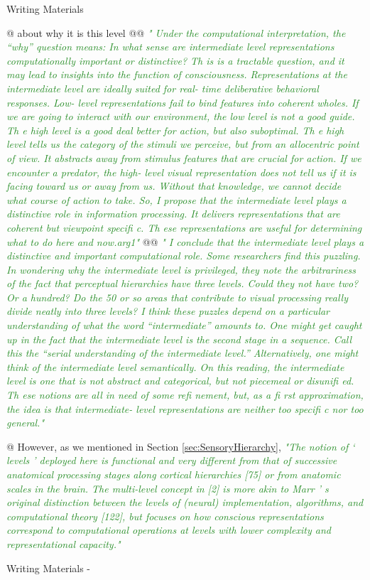 \documentclass[utf8]{article}
\newenvironment{WritingMaterials} %
    	{
            \begin{tcolorbox}[enhanced,
                title=-,
                size=small,
                colbacktitle=Aquamarine,
                drop fuzzy shadow,
                fontupper=\small,
                boxrule=0.4pt,
                colback=Aquamarine!10!white,
                sharp corners]
                Writing Materials
            \end{tcolorbox}
            \begin{easylist}[itemize]
    	}
    	{
            \end{easylist}  
            \begin{tcolorbox}[enhanced,
                halign=flush right,
                halign title=right,
                size=small,
                colbacktitle=Aquamarine,
                drop fuzzy shadow,
                fontupper=\small,
                boxrule=0.4pt,
                colback=Aquamarine,
                colupper=White,
                sharp corners]
                Writing Materials -
            \end{tcolorbox}        
    	}
\newcommand{\rewrite}[1]{\textcolor{ForestGreen}{\textit{"#1"}}\newline}
\begin{document}
\begin{WritingMaterials}
				@ about why it is this level
				@@ \rewrite{
					Under the computational interpretation, the “why” question means: In what sense are intermediate level representations computationally important or distinctive? Th is is a tractable question, and it may lead to insights into the function of consciousness. Representations at the intermediate level are ideally suited for real- time deliberative behavioral responses. Low- level representations fail to bind features into coherent wholes. If we are going to interact with our environment, the low level is not a good guide. Th e high level is a good deal better for action, but also suboptimal. Th e high level tells us the category of the stimuli we perceive, but from an allocentric point of view. It abstracts away from stimulus features that are crucial for action. If we encounter a predator, the high- level visual representation does not tell us if it is facing toward us or away from us. Without that knowledge, we cannot decide what course of action to take. So, I propose that the intermediate level plays a distinctive role in information processing. It delivers representations that are coherent but viewpoint specifi c. Th ese representations are useful for determining what to do here and now.arg1} \cite{prinz2007intermediate}
				@@ \rewrite{
					I conclude that the intermediate level plays a distinctive and important computational role. Some researchers find this puzzling. In wondering why the intermediate level is privileged, they note the arbitrariness of the fact that perceptual hierarchies have three levels. Could they not have two? Or a hundred? Do the 50 or so areas that contribute to visual processing really divide neatly into three levels? I think these puzzles depend on a particular understanding of what the word “intermediate” amounts to. One might get caught up in the fact that the intermediate level is the second stage in a sequence. Call this the “serial understanding of the intermediate level.” Alternatively, one might think of the intermediate level semantically. On this reading, the intermediate level is one that is not abstract and categorical, but not piecemeal or disunifi ed. Th ese notions are all in need of some refi nement, but, as a fi rst approximation, the idea is that intermediate- level representations are neither too specifi c nor too general.}\cite{prinz2007intermediate}



				@ However, as we mentioned in Section \ref{sec:SensoryHierarchy}, \rewrite{The notion of ‘ levels ’ deployed here is functional and very different from that of successive anatomical processing stages along cortical hierarchies [75] or from anatomic scales in the brain. The multi-level concept in [2] is more akin to Marr ’ s original distinction between the levels of (neural) implementation, algorithms, and computational theory [122], but focuses on how conscious representations correspond to computational operations at levels with lower complexity and representational capacity.}\cite{pennartz2018consciousness,pennartz2015brain}
			\end{WritingMaterials}
\end{document}
